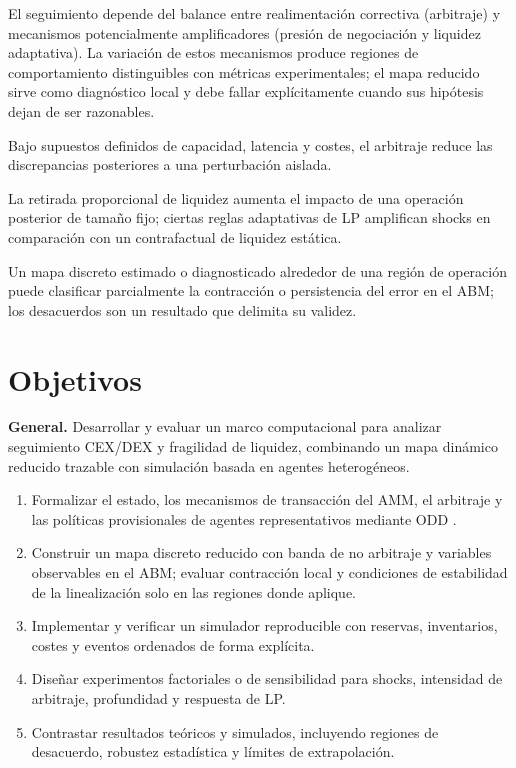 El seguimiento depende del balance entre realimentación correctiva (arbitraje) y
mecanismos potencialmente amplificadores (presión de negociación y liquidez
adaptativa). La variación de estos mecanismos produce regiones de comportamiento
distinguibles con métricas experimentales; el mapa reducido sirve como diagnóstico
local y debe fallar explícitamente cuando sus hipótesis dejan de ser razonables.

\begin{description}[style=nextline]
  \item[H1a.] Bajo supuestos definidos de capacidad, latencia y costes, el arbitraje
    reduce las discrepancias posteriores a una perturbación aislada.
  \item[H1b.] La retirada proporcional de liquidez aumenta el impacto de una operación
    posterior de tamaño fijo; ciertas reglas adaptativas de LP amplifican shocks en
    comparación con un contrafactual de liquidez estática.
  \item[H1c.] Un mapa discreto estimado o diagnosticado alrededor de una región de
    operación puede clasificar parcialmente la contracción o persistencia del error en
    el ABM; los desacuerdos son un resultado que delimita su validez.
\end{description}

\section{Objetivos}

\textbf{General.} Desarrollar y evaluar un marco computacional para analizar seguimiento
CEX/DEX y fragilidad de liquidez, combinando un mapa dinámico reducido trazable con
simulación basada en agentes heterogéneos.

\begin{enumerate}
  \item Formalizar el estado, los mecanismos de transacción del AMM, el arbitraje y las
    políticas provisionales de agentes representativos mediante ODD \cite{grimm2020odd}.
  \item Construir un mapa discreto reducido con banda de no arbitraje y variables
    observables en el ABM; evaluar contracción local y condiciones de estabilidad de la
    linealización solo en las regiones donde aplique.
  \item Implementar y verificar un simulador reproducible con reservas, inventarios,
    costes y eventos ordenados de forma explícita.
  \item Diseñar experimentos factoriales o de sensibilidad para shocks, intensidad de
    arbitraje, profundidad y respuesta de LP.
  \item Contrastar resultados teóricos y simulados, incluyendo regiones de desacuerdo,
    robustez estadística y límites de extrapolación.
\end{enumerate}
